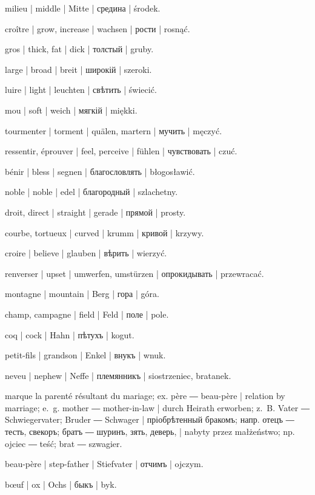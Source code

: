 \begin{ekzvocab}{1em}
 milieu | middle | Mitte | средина | środek.

 croître | grow, increase | wachsen | рости | rosnąć.

 gros | thick, fat | dick | толстый | gruby.

 large | broad | breit | широкій | szeroki.

 luire | light | leuchten | свѣтить | świecić.

 mou | soft | weich | мягкій | miękki.

 tourmenter | torment | quälen, martern | мучить | męczyć.

 ressentir, éprouver | feel, perceive | fühlen | чувствовать | czuć.

 bénir | bless | segnen | благословлять | błogosławić.

 noble | noble | edel | благородный | szlachetny.

 droit, direct | straight | gerade | прямой | prosty.

 courbe, tortueux | curved | krumm | кривой | krzywy.

 croire | believe | glauben | вѣрить | wierzyć.

 renverser | upset | umwerfen, umstürzen | опрокидывать | przewracać.

 montagne | mountain | Berg | гора | góra.

 champ, campagne | field | Feld | поле | pole.

 coq | cock | Hahn | пѣтухъ | kogut.

 petit-fils | grandson | Enkel | внукъ | wnuk.

 neveu | nephew | Neffe | племянникъ | siostrzeniec, bratanek.

\begin{minipage}{\textwidth}
 marque la parenté résultant du mariage; ex.  père ―  beau-père | relation by marriage; e.~g.  mother ―  mother-in-law | durch Heirath erworben; z.~B.  Vater ―  Schwiegervater;  Bruder ―  Schwager | пріобрѣтенный бракомъ; напр.  отецъ ―  тесть, свекоръ;  братъ ―  шуринъ, зять, деверь, | nabyty przez małżeństwo; np.  ojciec ―  teść;  brat ―  szwagier.

 beau-père | step-father | Stiefvater | отчимъ | ojczym.

 bœuf | ox | Ochs | быкъ | byk.
\end{minipage}

\end{ekzvocab}

